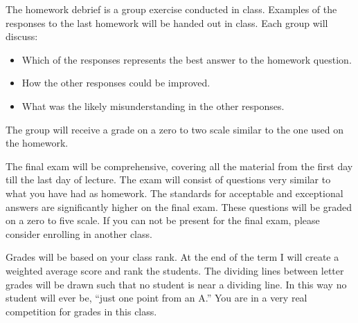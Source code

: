 \documentclass[letterpaper,10pt]{article}
\begin{document}
The homework debrief is a group exercise conducted in class. Examples of the responses to the last homework will be handed out in class.  Each group will discuss:

\begin{itemize}
\item Which of the responses represents the best answer to the homework question.
\item How the other responses could be improved.
\item What was the likely misunderstanding in the other responses.
\end{itemize}

The group will receive a grade on a zero to two scale similar to the one used on the homework.

The final exam will be comprehensive, covering all the material from the first day till the last day of lecture. The exam will consist of questions very similar to what you have had as homework.  The standards for acceptable and exceptional answers are significantly higher on the final exam.  These questions will be graded on a zero to five scale.  If you can not be present for the final exam, please consider enrolling in another class.


Grades will be based on your class rank. At the end of the term I will
create a weighted average score and rank the students. The dividing
lines between letter grades will be drawn such that no student is near
a dividing line. In this way no student will ever be, ``just one point
from an A.'' You are in a very real competition for grades in this
class. 
\end{document}
